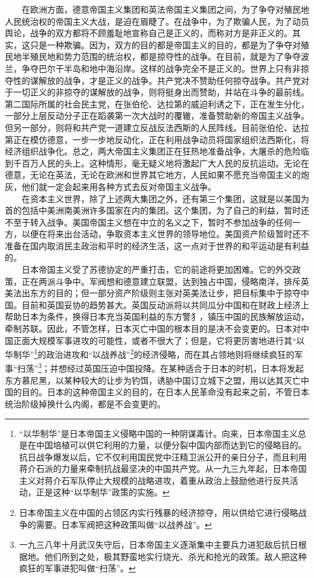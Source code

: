 \documentclass[cn,11pt,chinese]{elegantbook}
\begin{document}
　　在欧洲方面，德意帝国主义集团和英法帝国主义集团之间，为了争夺对殖民地人民统治权的帝国主义大战，是迫在眉睫了。在战争中，为了欺骗人民，为了动员舆论，战争的双方都将不顾羞耻地宣称自己是正义的，而称对方是非正义的。其实，这只是一种欺骗。因为，双方的目的都是帝国主义的目的，都是为了争夺对殖民地半殖民地和势力范围的统治权，都是掠夺性的战争。在目前，就是为了争夺波兰，争夺巴尔干半岛和地中海沿岸。这样的战争完全不是正义的。世界上只有非掠夺性的谋解放的战争，才是正义的战争。共产党决不赞助任何掠夺战争。共产党对于一切正义的非掠夺的谋解放的战争，则将挺身出而赞助，并站在斗争的最前线。第二国际所属的社会民主党，在张伯伦、达拉第的威迫利诱之下，正在发生分化，一部分上层反动分子正在蹈袭第一次大战时的覆辙，准备赞助新的帝国主义战争。但另一部分，则将和共产党一道建立反战反法西斯的人民阵线。目前张伯伦、达拉第正在模仿德意，一步一步地反动化，正在利用战争动员将国家组织法西斯化，将经济组织战争化。总之，两大帝国主义集团正在狂热地准备战争，大屠杀的危险临到千百万人民的头上。这种情形，毫无疑义地将激起广大人民的反抗运动。无论在德意，无论在英法，无论在欧洲和世界其它地方，人民如果不愿充当帝国主义的炮灰，他们就一定会起来用各种方式去反对帝国主义战争。\\
　　在资本主义世界，除了上述两大集团之外，还有第三个集团，这就是以美国为首的包括中美洲南美洲许多国家在内的集团。这个集团，为了自己的利益，暂时还不至于转入战争。美国帝国主义想在中立的名义之下，暂时不参加战争的任何一方，以便在将来出台活动，争取资本主义世界的领导地位。美国资产阶级暂时还不准备在国内取消民主政治和平时的经济生活，这一点对于世界的和平运动是有利益的。\\
　　日本帝国主义受了苏德协定的严重打击，它的前途将更加困难。它的外交政策，正在两派斗争中。军阀想和德意建立联盟，达到独占中国，侵略南洋，排斥英美法出东方的目的；但一部分资产阶级则主张对英美法让步，把目标集中于掠夺中国。目前和英国妥协的趋势甚大。英国反动派将以共同瓜分中国和在财政上经济上帮助日本为条件，换得日本充当英国利益的东方警犭，镇压中国的民族解放运动，牵制苏联。因此，不管怎样，日本灭亡中国的根本目的是决不会变更的。日本对中国正面大规模军事进攻的可能性，或者不很大了；但是，它将更厉害地进行其“以华制华”\footnote[7]{ “以华制华”是日本帝国主义侵略中国的一种阴谋毒计。向来，日本帝国主义总是在中国培植可以供它利用的力量，以便分裂中国内部而达到它的侵略目的。抗日战争爆发以后，它不仅利用国民党中汪精卫派公开的亲日分子，而且利用蒋介石派的力量来牵制抗战最坚决的中国共产党。从一九三九年起，日本帝国主义对蒋介石军队停止大规模的战略进攻，着重从政治上鼓励他进行反共活动，正是这种“以华制华”政策的实施。}的政治进攻和“以战养战”\footnote[8]{ 日本帝国主义在中国的占领区内实行残暴的经济掠夺，用以供给它进行侵略战争的需要。日本军阀把这种政策叫做“以战养战”。}的经济侵略，而在其占领地则将继续疯狂的军事“扫荡”\footnote[9]{ 一九三八年十月武汉失守后，日本帝国主义逐渐集中主要兵力进犯敌后抗日根据地。他们所到之处，极其野蛮地实行烧光、杀光和抢光的政策。敌人把这种疯狂的军事进犯叫做“扫荡”。}；并想经过英国压迫中国投降。在某种适合于日本的时机，日本将发起东方慕尼黑，以某种较大的让步为钓饵，诱胁中国订立城下之盟，用以达其灭亡中国的目的。日本的这种帝国主义的目的，在日本人民革命没有起来之前，不管日本统治阶级掉换什么内阁，都是不会变更的。\\
\end{document}
